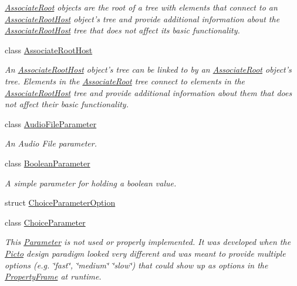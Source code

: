 \begin{DoxyCompactItemize}
\begin{DoxyCompactList}\small\item\em \hyperlink{class_picto_1_1_associate_root}{Associate\-Root} objects are the root of a tree with elements that connect to an \hyperlink{class_picto_1_1_associate_root_host}{Associate\-Root\-Host} object's tree and provide additional information about the \hyperlink{class_picto_1_1_associate_root_host}{Associate\-Root\-Host} tree that does not affect its basic functionality. \end{DoxyCompactList}\item 
class \hyperlink{class_picto_1_1_associate_root_host}{Associate\-Root\-Host}
\begin{DoxyCompactList}\small\item\em An \hyperlink{class_picto_1_1_associate_root_host}{Associate\-Root\-Host} object's tree can be linked to by an \hyperlink{class_picto_1_1_associate_root}{Associate\-Root} object's tree. Elements in the \hyperlink{class_picto_1_1_associate_root}{Associate\-Root} tree connect to elements in the \hyperlink{class_picto_1_1_associate_root_host}{Associate\-Root\-Host} tree and provide additional information about them that does not affect their basic functionality. \end{DoxyCompactList}\item 
class \hyperlink{class_picto_1_1_audio_file_parameter}{Audio\-File\-Parameter}
\begin{DoxyCompactList}\small\item\em An Audio File parameter. \end{DoxyCompactList}\item 
class \hyperlink{class_picto_1_1_boolean_parameter}{Boolean\-Parameter}
\begin{DoxyCompactList}\small\item\em A simple parameter for holding a boolean value. \end{DoxyCompactList}\item 
struct \hyperlink{struct_picto_1_1_choice_parameter_option}{Choice\-Parameter\-Option}
\item 
class \hyperlink{class_picto_1_1_choice_parameter}{Choice\-Parameter}
\begin{DoxyCompactList}\small\item\em This \hyperlink{class_picto_1_1_parameter}{Parameter} is not used or properly implemented. It was developed when the \hyperlink{namespace_picto}{Picto} design paradigm looked very different and was meant to provide multiple options (e.\-g. \char`\"{}fast\char`\"{}, \char`\"{}medium\char`\"{} \char`\"{}slow\char`\"{}) that could show up as options in the \hyperlink{class_property_frame}{Property\-Frame} at runtime. \end{DoxyCompactList}\item 

\end{DoxyCompactItemize}
